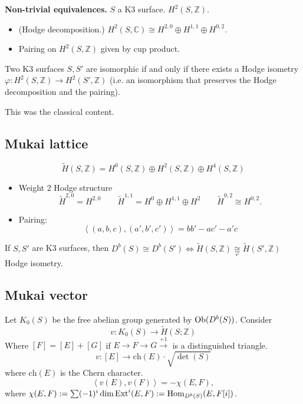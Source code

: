 \medskip\noindent
{\bf Non-trivial equivalences.} $S$ a K3 surface. $H^{2}(S,\mathbb{Z})$.
\begin{itemize}
\item (Hodge decomposition.) 
$H^{2}(S,\mathbb{C})\cong H^{2,0} \oplus H^{1,1} \oplus H^{0,2}$.
\item Pairing on $H^{2}(S,\mathbb{Z})$ given by cup product.
\end{itemize}

\begin{theorem}
\label{theorem-Torelli-for-K3}
Two K3 surfaces $S,S'$ are isomorphic if and only if there exists a Hodge
isometry $\varphi:H^{2}(S,\mathbb{Z})\to H^{2}(S',\mathbb{Z})$ 
(i.e. an isomorphism that preserves the Hodge decomposition and the pairing).
\end{theorem}

This was the classical content.

\subsection{Mukai lattice}
\label{subsection-Mukai-lattice}
$$
\tilde{H}(S,\mathbb{Z})
=H^{0}(S,\mathbb{Z})\oplus H^{2}(S,\mathbb{Z})\oplus H^{4}(S,\mathbb{Z})
$$
\begin{itemize}
\item Weight 2 Hodge structure
$$
\tilde{H}^{2,0}=H^{2,0}\qquad \tilde{H}^{1,1}=H^0\oplus H^{1,1}\oplus H^2
\qquad \tilde{H}^{0,2}\cong H^{0,2}.
$$
\item Pairing:
$$
\left<(a,b,c),(a',b',c')\right>=bb'-ac'-a'c
$$
\end{itemize}

\begin{theorem}
\label{theorem-Mukai-Orlov}
If $S,S'$ are K3 surfaces, then $D^b(S) \cong D^b(S')\iff
\tilde{H}(S,\mathbb{Z})\underset{\varphi}{\cong}\tilde{H}(S',\mathbb{Z})$ Hodge
isometry.
\end{theorem}

\subsection{Mukai vector}
\label{subsection-Mukai-vector}

Let $K_0(S)$ be the free abelian group generated by $\mathop{\mathrm{Ob}}\nolimits(D^b(S))$. Consider
$$
v:K_0(S)\to \tilde{H}(S;\mathbb{Z})
$$
Where $[F]=[E]+[G]$ if $E \to F \to G \xrightarrow{+1}$ is a distinguished
triangle.
$$
v:[E] \to \text{ch}(E)\cdot \sqrt{\det(S)}
$$
where $\text{ch}(E)$ is the Chern character.
$$
\left<v(E),v(F)\right>=-\chi(E,F),
$$
where $\chi(E,F):=\sum(-1)^i\dim\text{Ext}^i(E,F):=\mathop{\mathrm{Hom}}\nolimits_{D^b(S)}(E,F[i])$.

